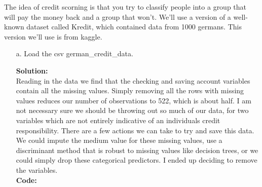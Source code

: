 \documentclass[12pt]{article}
\makeatletter
\theoremstyle{homework}
\newenvironment{exercise}[1]
{\def\@currentlabel{#1}\exercisecore}
{\endexercisecore}
\newcommand{\localhead}[1]{\par\smallskip\noindent\textbf{#1}\nobreak\\}%
\newcommand\solution{\localhead{Solution:}}
\makeatother
\begin{document}
\begin{exercise}{1} The idea of credit scorning is that you try to classify people into a group that will pay the money back and a group that won't. We'll use a version of a well-known dataset called Kredit, 
  which contained data from 1000 germans. This version we'll use is from kaggle.\\
  \begin{enumerate}
    \item[a.] Load the csv german\_credit\_data.\\
    \solution Reading in the data we find that the checking and saving account variables contain all the missing values. Simply removing all the rows with missing values reduces our number of observations to 522, which is about half.
    I am not necessary sure we should be throwing out so much of our data, for two variables which are not entirely indicative of an individuals credit responsibility. There are a few actions we can take to try and save this data.
    We could impute the medium value for these missing values, use a discriminant method that is robust to missing values like decision trees, or we could simply drop these categorical predictors. I ended up deciding to remove the variables.\\
      \textbf{Code:}
      \begin{center}
      
      \end{center}
      \vspace{.15in}


\end{enumerate}
\end{exercise}
\end{document}
